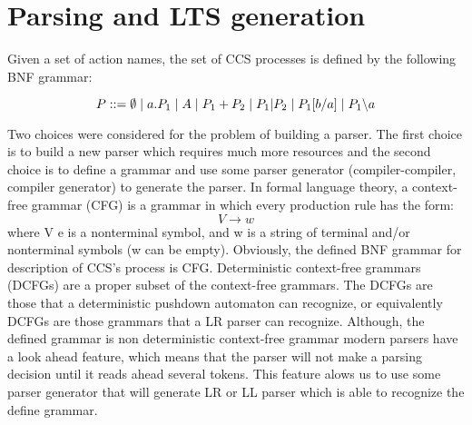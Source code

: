 \section{Parsing and LTS generation}

Given a set of action names, the set of CCS processes is defined by the following BNF grammar:

\[P ::= \emptyset \hspace{1 mm} | \hspace{1 mm} a.P_{1} \hspace{1 mm} | \hspace{1 mm} A \hspace{1 mm} | \hspace{1 mm}P_{1}+P_{2} \hspace{1 mm} |
\hspace{1 mm} P_{1} | P_{2} \hspace{1 mm} | \hspace{1 mm} P_{1}[b/a] \hspace{1 mm} | \hspace{1 mm} P_{1} \backslash a\]

Two choices were considered for the problem of building a parser. The first choice is to build
a new parser which requires much more resources and the second choice is to define a grammar
and use some parser generator (compiler-compiler, compiler generator) to generate the parser.
In formal language theory, a context-free grammar (CFG) is a grammar in which every production 
rule has the form:
\[V \rightarrow w \]
where V e is a nonterminal symbol, and w is a string of terminal and/or nonterminal symbols 
(w can be empty). Obviously, the defined BNF grammar for description of CCS's process is CFG. 
Deterministic context-free grammars (DCFGs) are a proper subset of the context-free grammars.
The DCFGs are those that a deterministic pushdown automaton can recognize, or equivalently DCFGs
are those grammars that a LR parser can recognize. Although, the defined grammar is non 
deterministic context-free grammar modern parsers have a look ahead feature, which means that
the parser will not make a parsing decision until it reads ahead several tokens. This feature
alows us to use some parser generator that will generate LR or LL parser which is able to
recognize the define grammar.

